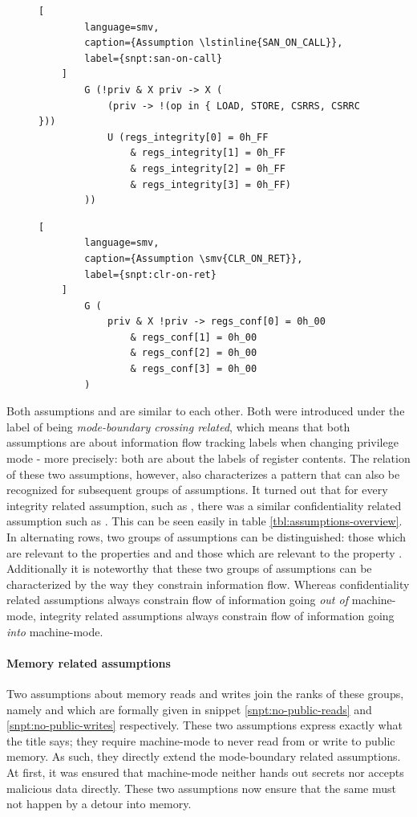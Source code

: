 \begin{figure}
    \begin{lstlisting}[
        language=smv,
        caption={Assumption \lstinline{SAN_ON_CALL}},
        label={snpt:san-on-call}
    ]
        G (!priv & X priv -> X (
            (priv -> !(op in { LOAD, STORE, CSRRS, CSRRC }))
            U (regs_integrity[0] = 0h_FF
                & regs_integrity[1] = 0h_FF
                & regs_integrity[2] = 0h_FF
                & regs_integrity[3] = 0h_FF)
        ))
    \end{lstlisting}

    \begin{lstlisting}[
        language=smv,
        caption={Assumption \smv{CLR_ON_RET}},
        label={snpt:clr-on-ret}
    ]
        G (
            priv & X !priv -> regs_conf[0] = 0h_00
                & regs_conf[1] = 0h_00
                & regs_conf[2] = 0h_00
                & regs_conf[3] = 0h_00
        )
    \end{lstlisting}
\end{figure}

Both assumptions  and  are similar to each other.
Both were introduced under the label of being \textit{mode-boundary crossing related}, which means that both assumptions are about information flow tracking labels when changing privilege mode - more precisely: both are about the labels of register contents.
The relation of these two assumptions, however, also characterizes a pattern that can also be recognized for subsequent groups of assumptions.
It turned out that for every integrity related assumption, such as , there was a similar confidentiality related assumption such as .
This can be seen easily in table \ref{tbl:assumptions-overview}.
In alternating rows, two groups of assumptions can be distinguished: those which are relevant to the properties  and  and those which are relevant to the property .
Additionally it is noteworthy that these two groups of assumptions can be characterized by the way they constrain information flow.
Whereas confidentiality related assumptions always constrain flow of information going \textit{out of} machine-mode, integrity related assumptions always constrain flow of information going \textit{into} machine-mode.

\paragraph{Memory related assumptions}
Two assumptions about memory reads and writes join the ranks of these groups, namely  and  which are formally given in snippet \ref{snpt:no-public-reads} and \ref{snpt:no-public-writes} respectively.
These two assumptions express exactly what the title says; they require machine-mode to never read from or write to public memory.
As such, they directly extend the mode-boundary related assumptions.
At first, it was ensured that machine-mode neither hands out secrets nor accepts malicious data directly.
These two assumptions now ensure that the same must not happen by a detour into memory.

